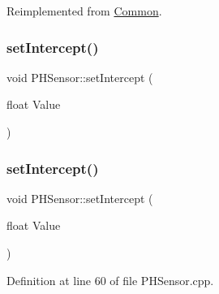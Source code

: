 Reimplemented from \hyperlink{class_common_a9e60e2c26a5f4d72342a59a969954636}{Common}.

\mbox{\label{class_p_h_sensor_a41bd303fbad556aaf714da2f0bf4a69c}} 
\subsubsection{\texorpdfstring{set\+Intercept()}{setIntercept()}\hspace{0.1cm}{\footnotesize\ttfamily [1/2]}}
{\footnotesize\ttfamily void P\+H\+Sensor\+::set\+Intercept (\begin{DoxyParamCaption}\item[{float}]{Value }\end{DoxyParamCaption})\hspace{0.3cm}{\ttfamily [protected]}}

\mbox{\label{class_p_h_sensor_a41bd303fbad556aaf714da2f0bf4a69c}} 
\subsubsection{\texorpdfstring{set\+Intercept()}{setIntercept()}\hspace{0.1cm}{\footnotesize\ttfamily [2/2]}}
{\footnotesize\ttfamily void P\+H\+Sensor\+::set\+Intercept (\begin{DoxyParamCaption}\item[{float}]{Value }\end{DoxyParamCaption})\hspace{0.3cm}{\ttfamily [protected]}}



Definition at line 60 of file P\+H\+Sensor.\+cpp.

